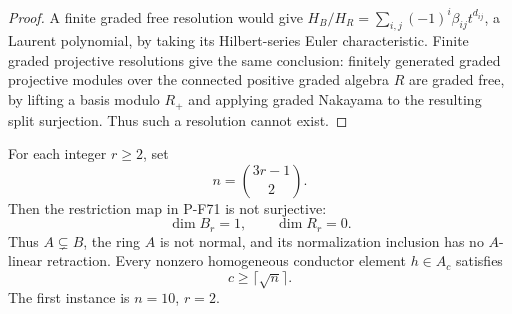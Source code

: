 \begin{proof}
A finite graded free resolution would give
$H_B/H_R=\sum_{i,j}(-1)^i\beta_{ij}t^{d_{ij}}$, a Laurent
polynomial, by taking its Hilbert-series Euler characteristic.
Finite graded projective resolutions give the same
conclusion: finitely generated graded projective modules
over the connected positive graded algebra $R$ are graded
free, by lifting a basis modulo $R_+$ and applying graded
Nakayama to the resulting split surjection.  Thus such a
resolution cannot exist.
\end{proof}

\begin{corollary}
For each integer $r\ge2$, set
\[
                    n=\binom{3r-1}{2}.
                                                               \tag{P-F71m}
\]
Then the restriction map in P-F71 is not surjective:
\[
                    \dim B_r=1,\qquad \dim R_r=0.
                                                               \tag{P-F71n}
\]
Thus $A\subsetneq B$, the ring $A$ is not normal,
and its normalization inclusion has no $A$-linear
retraction.  Every nonzero homogeneous conductor
element $h\in A_c$ satisfies
\[
                            c\ge\lceil\sqrt n\rceil.
                                                               \tag{P-F71o}
\]
The first instance is $n=10$, $r=2$.
\end{corollary}

